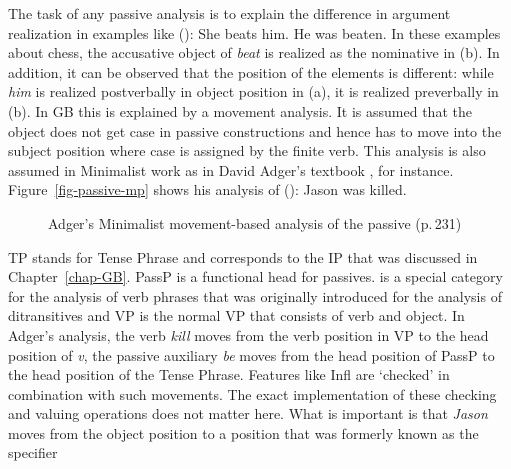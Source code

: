 The task of any passive analysis is to explain the difference in argument realization in examples
like ():
\eal
\ex\label{ex-she-beats-him}
She beats him.
\ex\label{ex-he-was-beaten}
He was beaten.
\zl
In these examples about chess, the accusative object of \emph{beat} is realized as the nominative
in (b). In addition, it can be observed that the position of the elements is different: while
\emph{him} is realized postverbally in object position in (a), it is realized preverbally in
(b). In GB this is explained by a movement analysis. It is assumed that the object does not
get case in passive constructions and hence has to move into the subject position where case is
assigned by the finite verb. This analysis is also assumed in Minimalist work as in
David Adger's textbook \citeyearpar{Adger2003a}, for instance. Figure~\vref{fig-passive-mp} shows his analysis
of ():
\ea
Jason was killed.
\z
\begin{figure}
\centerfit{
\begin{forest}
for tree={fit=rectangle}
[TP
  [Jason]
  [{\tbar[\st{\textit{u}N*}]}
     [{T[past,\st{nom}]}
       [be{[Pass,\st{\textit{u}Infl}:past*]}]
       [{T[past]}]]
     [PassP
       [\phonliste{be}]
       [\vP
         [\textit{v}
           [\textit{kill}]
           [{\textit{v}[\st{\textit{u}Infl}:Pass]}]]
         [VP
           [\phonliste{kill}]
           [\phonliste{Jason}]]]]]]
]
\end{forest}
}
\caption{\label{fig-passive-mp}Adger's Minimalist movement-based analysis of the passive (p.\,231)}
\end{figure}%
TP stands for Tense Phrase and corresponds to the IP that was discussed in
Chapter~\ref{chap-GB}. PassP is a functional head for passives. \vP{} is
a special category for the analysis of verb phrases that was originally introduced for the analysis
of ditransitives \citep{Larson88a}
and VP is the normal VP that consists of verb and object. In Adger's analysis, the
verb \emph{kill} moves from the verb position in VP to the head position of \textit{v}, the
passive auxiliary \emph{be} moves from the head position of PassP to the head position of the Tense
Phrase. Features like Infl are `checked' in combination with such movements. The exact implementation
of these checking and valuing operations does not matter here. What is important is that
\emph{Jason} moves from the object position to a position that was formerly known as the specifier
